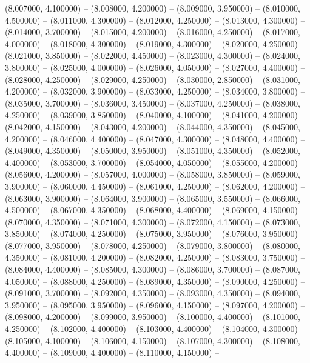 (8.007000, 4.100000) -- 
(8.008000, 4.200000) -- 
(8.009000, 3.950000) -- 
(8.010000, 4.500000) -- 
(8.011000, 4.300000) -- 
(8.012000, 4.250000) -- 
(8.013000, 4.300000) -- 
(8.014000, 3.700000) -- 
(8.015000, 4.200000) -- 
(8.016000, 4.250000) -- 
(8.017000, 4.000000) -- 
(8.018000, 4.300000) -- 
(8.019000, 4.300000) -- 
(8.020000, 4.250000) -- 
(8.021000, 3.850000) -- 
(8.022000, 4.450000) -- 
(8.023000, 4.300000) -- 
(8.024000, 3.800000) -- 
(8.025000, 4.000000) -- 
(8.026000, 4.050000) -- 
(8.027000, 4.400000) -- 
(8.028000, 4.250000) -- 
(8.029000, 4.250000) -- 
(8.030000, 2.850000) -- 
(8.031000, 4.200000) -- 
(8.032000, 3.900000) -- 
(8.033000, 4.250000) -- 
(8.034000, 3.800000) -- 
(8.035000, 3.700000) -- 
(8.036000, 3.450000) -- 
(8.037000, 4.250000) -- 
(8.038000, 4.250000) -- 
(8.039000, 3.850000) -- 
(8.040000, 4.100000) -- 
(8.041000, 4.200000) -- 
(8.042000, 4.150000) -- 
(8.043000, 4.200000) -- 
(8.044000, 4.350000) -- 
(8.045000, 4.200000) -- 
(8.046000, 4.400000) -- 
(8.047000, 4.300000) -- 
(8.048000, 4.400000) -- 
(8.049000, 4.350000) -- 
(8.050000, 3.950000) -- 
(8.051000, 4.350000) -- 
(8.052000, 4.400000) -- 
(8.053000, 3.700000) -- 
(8.054000, 4.050000) -- 
(8.055000, 4.200000) -- 
(8.056000, 4.200000) -- 
(8.057000, 4.000000) -- 
(8.058000, 3.850000) -- 
(8.059000, 3.900000) -- 
(8.060000, 4.450000) -- 
(8.061000, 4.250000) -- 
(8.062000, 4.200000) -- 
(8.063000, 3.900000) -- 
(8.064000, 3.900000) -- 
(8.065000, 3.550000) -- 
(8.066000, 4.500000) -- 
(8.067000, 4.350000) -- 
(8.068000, 4.400000) -- 
(8.069000, 4.150000) -- 
(8.070000, 4.350000) -- 
(8.071000, 4.300000) -- 
(8.072000, 4.150000) -- 
(8.073000, 3.850000) -- 
(8.074000, 4.250000) -- 
(8.075000, 3.950000) -- 
(8.076000, 3.950000) -- 
(8.077000, 3.950000) -- 
(8.078000, 4.250000) -- 
(8.079000, 3.800000) -- 
(8.080000, 4.350000) -- 
(8.081000, 4.200000) -- 
(8.082000, 4.250000) -- 
(8.083000, 3.750000) -- 
(8.084000, 4.400000) -- 
(8.085000, 4.300000) -- 
(8.086000, 3.700000) -- 
(8.087000, 4.050000) -- 
(8.088000, 4.250000) -- 
(8.089000, 4.350000) -- 
(8.090000, 4.250000) -- 
(8.091000, 3.700000) -- 
(8.092000, 4.350000) -- 
(8.093000, 4.350000) -- 
(8.094000, 3.950000) -- 
(8.095000, 3.950000) -- 
(8.096000, 4.150000) -- 
(8.097000, 4.200000) -- 
(8.098000, 4.200000) -- 
(8.099000, 3.950000) -- 
(8.100000, 4.400000) -- 
(8.101000, 4.250000) -- 
(8.102000, 4.400000) -- 
(8.103000, 4.400000) -- 
(8.104000, 4.300000) -- 
(8.105000, 4.100000) -- 
(8.106000, 4.150000) -- 
(8.107000, 4.300000) -- 
(8.108000, 4.400000) -- 
(8.109000, 4.400000) -- 
(8.110000, 4.150000) -- 
